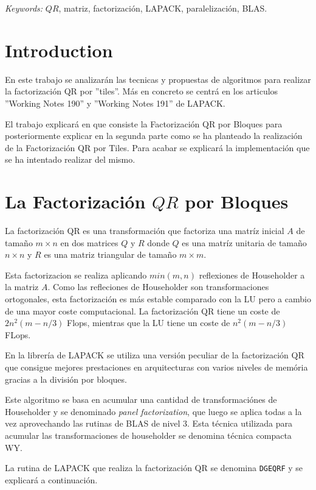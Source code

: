 \documentclass[12pt]{article}
\begin{document}
\noindent%
{\it Keywords:}  $QR$, matriz, factorización, LAPACK, paralelización, BLAS.

\section{Introduction}
\label{sec:intro}

En este trabajo se analizarán las tecnicas y propuestas de algoritmos para realizar la factorización QR por ''tiles''. Más en concreto se centrá en los articulos ''Working Notes 190'' y ''Working Notes 191'' de LAPACK.

El trabajo explicará en que consiste la Factorización QR por Bloques para posteriormente explicar en la segunda parte como se ha planteado la realización de la Factorización QR por Tiles. Para acabar se explicará la implementación que se ha intentado realizar del mismo.

\section{La Factorización $QR$ por Bloques}
\label{sec:block_qr}

La factorización QR es una transformación que factoriza una matríz inicial $A$ de tamaño $m \times n$ en dos matrices $Q$ y $R$ donde $Q$ es una matríz unitaria de tamaño $n \times n$ y $R$ es una matriz triangular de tamaño $m \times m$. 

Esta factorizacion se realiza aplicando $min(m,n)$ reflexiones de Householder a la matriz $A$. Como las refleciones de Householder son transformaciones ortogonales, esta factorización es más estable comparado con la LU pero a cambio de una mayor coste computacional. La factorización QR tiene un coste de $2n^2(m-n/3)$ Flops, mientras que la LU tiene un coste de $n^2(m-n/3)$ FLops.

En la librería de LAPACK se utiliza una versión peculiar de la factorización QR que consigue mejores prestaciones en arquitecturas con varios niveles de memória gracias a la división por bloques. 

Este algoritmo se basa en acumular una cantidad de transformaciónes de 
Householder y se denominado {\it panel factorization}, que luego se aplica todas a la vez aprovechando las rutinas de BLAS de nivel 3. Esta técnica utilizada para acumular las transformaciones de householder se denomina técnica compacta WY.

La rutina de LAPACK que realiza la factorización QR se denomina \texttt{DGEQRF} y se explicará a continuación.%
\end{document}
